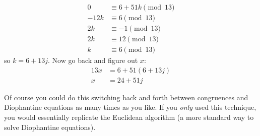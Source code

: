 \documentclass[12pt]{article}
\begin{document}
\[
\begin{aligned}
0 &\equiv 6 + 51k \pmod{13}\\
-12k &\equiv 6 \pmod{13}\\
2k &\equiv -1 \pmod{13}\\
2k &\equiv 12 \pmod{13}\\
k &\equiv 6 \pmod{13}
\end{aligned}
\]
so $k = 6 + 13j$.  Now go back and figure out $x$:
\[
\begin{aligned}
13x & = 6 + 51(6+13j)\\
x & = 24 + 51j
\end{aligned}
\]

Of course you could do this switching back and forth between congruences and Diophantine equations as many times as you like.  If you {\em only} used this technique, you would essentially replicate the Euclidean algorithm (a more standard way to solve Diophantine equations). 
\end{document}
